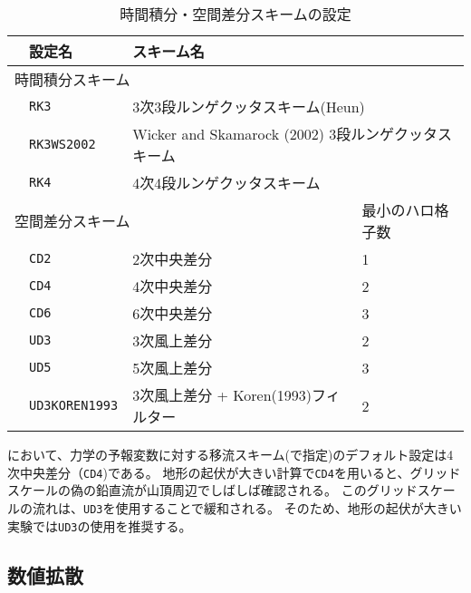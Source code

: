 \begin{table}[h]
\begin{center}
  \caption{時間積分・空間差分スキームの設定}
  \label{tab:nml_atm_dyn}
  \begin{tabularx}{150mm}{llXX} \hline
    \rowcolor[gray]{0.9} & \multicolumn{1}{l}{設定名} & \multicolumn{1}{l}{スキーム名} & \\ \hline
    \multicolumn{3}{l}{時間積分スキーム} &  \\ \hline
    & \multicolumn{1}{l}{\verb|RK3|} & \multicolumn{2}{l}{3次3段ルンゲクッタスキーム(Heun)} \\
    & \multicolumn{1}{l}{\verb|RK3WS2002|} & \multicolumn{2}{l}{Wicker and Skamarock (2002) 3段ルンゲクッタスキーム} \\
    & \multicolumn{1}{l}{\verb|RK4|} & \multicolumn{2}{l}{4次4段ルンゲクッタスキーム} \\
    \hline
    \multicolumn{3}{l}{空間差分スキーム} & 最小のハロ格子数\\ \hline
    & \multicolumn{1}{l}{\verb|CD2|} & \multicolumn{1}{l}{2次中央差分} & \multicolumn{1}{l}{1}\\
    & \multicolumn{1}{l}{\verb|CD4|} & \multicolumn{1}{l}{4次中央差分} & \multicolumn{1}{l}{2}\\
    & \multicolumn{1}{l}{\verb|CD6|} & \multicolumn{1}{l}{6次中央差分} & \multicolumn{1}{l}{3}\\
    & \multicolumn{1}{l}{\verb|UD3|} & \multicolumn{1}{l}{3次風上差分} & \multicolumn{1}{l}{2}\\
    & \multicolumn{1}{l}{\verb|UD5|} & \multicolumn{1}{l}{5次風上差分} & \multicolumn{1}{l}{3}\\
    & \multicolumn{1}{l}{\verb|UD3KOREN1993|} & \multicolumn{1}{X}{3次風上差分 + Koren(1993)フィルター} & \multicolumn{1}{l}{2}\\
\hline
  \end{tabularx}
\end{center}
\end{table}

\scalerm において、力学の予報変数に対する移流スキーム(で指定)のデフォルト設定は4次中央差分（\verb|CD4|)である。
地形の起伏が大きい計算で\verb|CD4|を用いると、グリッドスケールの偽の鉛直流が山頂周辺でしばしば確認される。
このグリッドスケールの流れは、\verb|UD3|を使用することで緩和される。
そのため、地形の起伏が大きい実験では\verb|UD3|の使用を推奨する。

\subsection{数値拡散}

